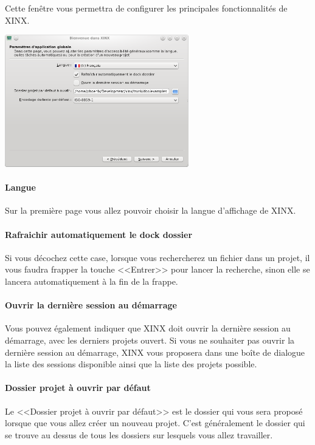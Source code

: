 \documentclass[a4paper,10pt,twoside]{book}
\begin{document}
Cette fenêtre vous permettra de configurer les principales fonctionnalités de XINX. 

\begin{center}
 \includegraphics[width=0.60\textwidth]{./firstinstall2.png}
\end{center}

\paragraph{Langue} Sur la première page vous allez pouvoir choisir la langue d'affichage de XINX. 

\paragraph{Rafraichir automatiquement le dock dossier} Si vous décochez cette case, lorsque vous rechercherez un fichier dans un projet, il vous faudra frapper la touche <<Entrer>> pour lancer la recherche, sinon elle se lancera automatiquement à la fin de la frappe.

\paragraph{Ouvrir la dernière session au démarrage} Vous pouvez également indiquer que XINX doit ouvrir la dernière session au démarrage, avec les derniers projets ouvert. Si vous ne souhaiter pas ouvrir la dernière session au démarrage, XINX vous proposera dans une boîte de dialogue la liste des sessions disponible ainsi que la liste des projets possible.

\paragraph{Dossier projet à ouvrir par défaut} Le <<Dossier projet à ouvrir par défaut>> est le dossier qui vous sera proposé lorsque que vous allez créer un nouveau projet. C'est généralement le dossier qui se trouve au dessus de tous les dossiers sur lesquels vous allez travailler.
\end{document}

